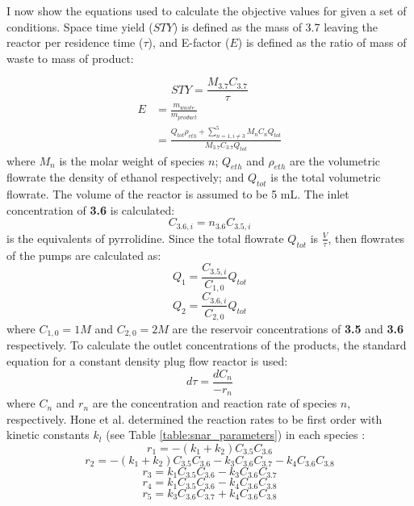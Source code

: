 I now show the equations used to calculate the objective values for given a set of conditions. Space time yield ($STY$) is defined as the mass of 3.7 leaving the reactor per residence time ($\tau$), and E-factor ($E$) is defined as the ratio of mass of waste to mass of product:

\begin{equation}
    \label{sty}
	STY = \frac{M_{3.7} C_{3.7}}{\tau}
\end{equation}
\begin{equation}
    \label{e_factor}
	\begin{split}
	 E & = \frac{m_{waste}}{m_{product}} \\ 
	   & = \frac{Q_{tot}\rho_{eth} + \sum_{n=1, i \neq 3}^5 M_nC_nQ_{tot}}{M_{3.7}C_{3.7}Q_{tot}}		
	\end{split}
\end{equation}
where $M_n$ is the molar weight of species $n$; $Q_{eth}$ and $\rho_{eth}$ are the volumetric flowrate the density of ethanol respectively; and $Q_{tot}$ is the total volumetric flowrate. The volume of the reactor is assumed to be 5 mL. The inlet concentration of \textbf{3.6} is calculated:
\begin{equation}
    C_{3.6,i} = n_{3.6} C_{3.5,i}
\end{equation}
is the equivalents of pyrrolidine. Since the total flowrate $Q_{tot}$ is $\frac{V}{\tau}$, then flowrates of the pumps are calculated as:
\begin{equation}
    Q_1 = \frac{C_{3.5,i}}{C_{1,0}}Q_{tot}
\end{equation}
\begin{equation}
    Q_2 = \frac{C_{3.6,i}}{C_{2,0}}Q_{tot}
\end{equation}
where $C_{1,0}=1 M$ and $C_{2,0}=2 M$ are the reservoir concentrations of \textbf{3.5} and \textbf{3.6  } respectively. To calculate the outlet concentrations of the products, the standard equation for a constant density plug flow reactor is used:
\begin{equation}
	\label{pfr}
	d\tau = \frac{dC_n}{- r_n}
\end{equation}
where $C_n$ and $r_n$ are the concentration and reaction rate of species $n$, respectively. Hone et al. determined the reaction rates to be first order with kinetic constants $k_l$ (see Table \ref{table:snar_parameters}) in each species \cite{Hone2017}:
\begin{equation}
    \label{equation:r_1}
	r_{1} = -(k_1+k_2)C_{3.5}C_{3.6}	
\end{equation}
\begin{equation}
	r_2 = -(k_1+k_2)C_{3.5}C_{3.6}-k_3C_{3.6}C_{3.7}-k_4C_{3.6}C_{3.8}
\end{equation}
\begin{equation}
	r_3 = k_1C_{3.5}C_{3.6}-k_3C_{3.6}C_{3.7}
\end{equation}
\begin{equation}
	r_4 = k_1C_{3.5}C_{3.6}-k_4C_{3.6}C_{3.8}
	\label{equation:r_4}
\end{equation}
\begin{equation}
	\label{last_snar_rxn_rate}
	r_5 = k_3C_{3.6}C_{3.7} + k_4C_{3.6}C_{3.8}
\end{equation}

